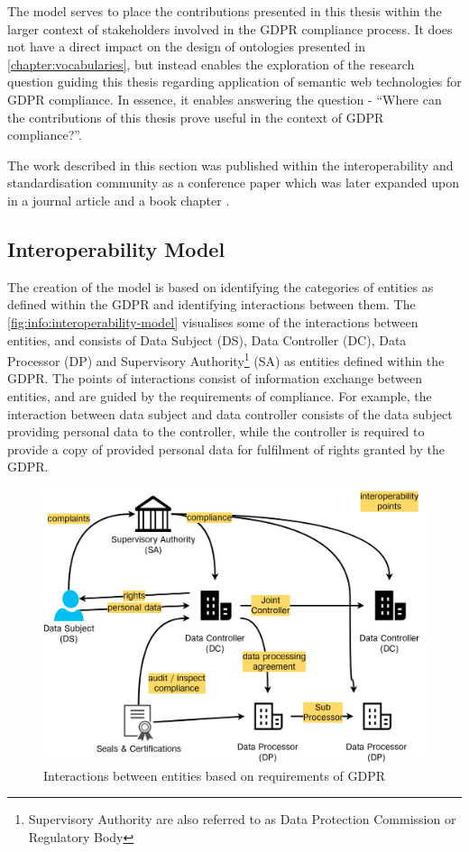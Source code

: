 The model serves to place the contributions presented in this thesis within the larger context of stakeholders involved in the GDPR compliance process. It does not have a direct impact on the design of ontologies presented in \autoref{chapter:vocabularies}, but instead enables the exploration of the research question guiding this thesis regarding application of semantic web technologies for GDPR compliance.
In essence, it enables answering the question - ``Where can the contributions of this thesis prove useful in the context of GDPR compliance?''.

The work described in this section was published within the interoperability and standardisation community as a conference paper
\cite{pandit_gdpr_2018} which was later expanded upon in a journal article \cite{pandit_exploration_2018} and a book chapter \cite{pandit_standardisation_2020}.

\subsection*{Interoperability Model}
The creation of the model is based on identifying the categories of entities as defined within the GDPR and identifying interactions between them.
The \autoref{fig:info:interoperability-model} visualises some of the interactions between entities, and consists of Data Subject (DS), Data Controller (DC), Data Processor (DP) and Supervisory Authority\footnote{Supervisory Authority are also referred to as Data Protection Commission or Regulatory Body} (SA) as entities defined within the GDPR.
The points of interactions consist of information exchange between entities, and are guided by the requirements of compliance. For example, the interaction between data subject and data controller consists of the data subject providing personal data to the controller, while the controller is required to provide a copy of provided personal data for fulfilment of rights granted by the GDPR.
\begin{figure}[htbp]
    \centering
    \includegraphics[width=0.75\linewidth]{img/interoperability-model.png}
    \caption{Interactions between entities based on requirements of GDPR \cite{pandit_exploration_2018}}
    \label{fig:info:interoperability-model}
\end{figure}

